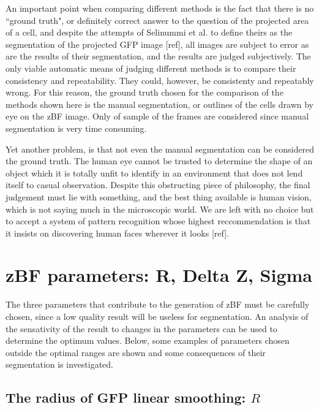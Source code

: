An important point when comparing different methods is the fact that there is no ``ground truth", or definitely correct answer to the question of the projected area of a cell, and despite the attempts of Selinummi et al. to define theirs as the segmentation of the projected GFP image [ref], all images are subject to error as are the results of their segmentation, and the results are judged subjectively. The only viable automatic means of judging different methods is to compare their consistency and repeatability. They could, however, be consistenty and repeatably wrong. For this reason, the ground truth chosen for the comparison of the methods shown here is the manual segmentation, or outlines of the cells drawn by eye on the zBF image. Only of sample of the frames are considered since manual segmentation is very time consuming.

Yet another problem, is that not even the manual segmentation can be considered the ground truth. The human eye cannot be trusted to determine the shape of an object which it is totally unfit to identify in an environment that does not lend itself to casual observation. Despite this obstructing piece of philosophy, the final judgement must lie with something, and the best thing available is human vision, which is not saying much in the microscopic world. We are left with no choice but to accept a system of pattern recognition whose highest reccommendation is that it insists on discovering human faces wherever it looks [ref].

\section{zBF parameters: R, Delta Z, Sigma}

The three parameters that contribute to the generation of zBF must be carefully chosen, since a low quality result will be useless for segmentation. An analysis of the sensativity of the result to changes in the parameters can be used to determine the optimum values. Below, some examples of parameters chosen outside the optimal ranges are shown and some consequences of their segmentation is investigated.

\subsection{The radius of GFP linear smoothing: $R$}

